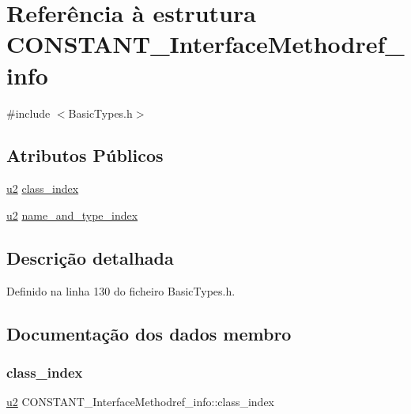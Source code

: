 \hypertarget{structCONSTANT__InterfaceMethodref__info}{}\section{Referência à estrutura C\+O\+N\+S\+T\+A\+N\+T\+\_\+\+Interface\+Methodref\+\_\+info}
\label{structCONSTANT__InterfaceMethodref__info}


{\ttfamily \#include $<$Basic\+Types.\+h$>$}

\subsection*{Atributos Públicos}
\begin{DoxyCompactItemize}
\item 
\hyperlink{BasicTypes_8h_a732cde1300aafb73b0ea6c2558a7a54f}{u2} \hyperlink{structCONSTANT__InterfaceMethodref__info_a0a7a6dd9207dec5f681a566a65276f66}{class\+\_\+index}
\item 
\hyperlink{BasicTypes_8h_a732cde1300aafb73b0ea6c2558a7a54f}{u2} \hyperlink{structCONSTANT__InterfaceMethodref__info_aeeb0a97e077fcbd839a67d7bb3ac6d5b}{name\+\_\+and\+\_\+type\+\_\+index}
\end{DoxyCompactItemize}


\subsection{Descrição detalhada}


Definido na linha 130 do ficheiro Basic\+Types.\+h.



\subsection{Documentação dos dados membro}
\mbox{\label{structCONSTANT__InterfaceMethodref__info_a0a7a6dd9207dec5f681a566a65276f66}} 
\subsubsection{\texorpdfstring{class\+\_\+index}{class\_index}}
{\footnotesize\ttfamily \hyperlink{BasicTypes_8h_a732cde1300aafb73b0ea6c2558a7a54f}{u2} C\+O\+N\+S\+T\+A\+N\+T\+\_\+\+Interface\+Methodref\+\_\+info\+::class\+\_\+index}



